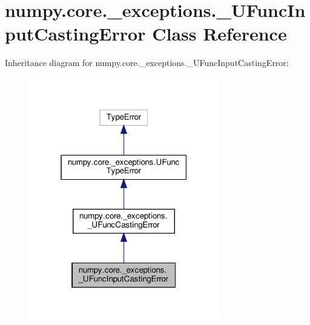 \hypertarget{classnumpy_1_1core_1_1__exceptions_1_1__UFuncInputCastingError}{}\section{numpy.\+core.\+\_\+exceptions.\+\_\+\+U\+Func\+Input\+Casting\+Error Class Reference}
\label{classnumpy_1_1core_1_1__exceptions_1_1__UFuncInputCastingError}


Inheritance diagram for numpy.\+core.\+\_\+exceptions.\+\_\+\+U\+Func\+Input\+Casting\+Error\+:
\nopagebreak
\begin{figure}[H]
\begin{center}
\leavevmode
\includegraphics[width=235pt]{classnumpy_1_1core_1_1__exceptions_1_1__UFuncInputCastingError__inherit__graph}
\end{center}
\end{figure}


